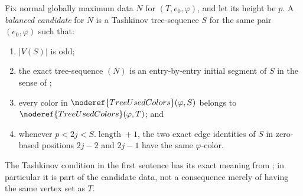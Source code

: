 \begin{definition}
Fix normal globally maximum data $N$ for $(T,e_0,\varphi)$, and let its
height be $p$.  A \emph{balanced candidate} for $N$ is a Tashkinov
tree-sequence $S$ for the same pair $(e_0,\varphi)$ such that:
\begin{enumerate}
\item $|V(S)|$ is odd;
\item the exact tree-sequence $(N)$ is an
entry-by-entry initial segment of $S$ in the sense of
;
\item every color in $\noderef{TreeUsedColors}(\varphi,S)$ belongs to
$\noderef{TreeUsedColors}(\varphi,T)$; and
\item whenever $p<2j<S.\operatorname{length}+1$, the two exact edge
identities of $S$ in zero-based positions $2j-2$ and $2j-1$ have the same
$\varphi$-color.
\end{enumerate}
The Tashkinov condition in the first sentence has its exact meaning from
; in particular it is part of the candidate data,
not a consequence merely of having the same vertex set as $T$.
\end{definition}
